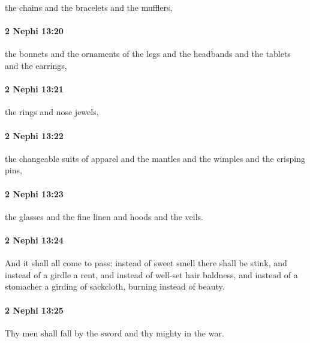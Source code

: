 			the chains and the bracelets and the mufflers,

		\paragraph{2 Nephi 13:20} %
			\label{2NEPHI-13-20}

			the bonnets and the ornaments of the legs
			and the headbands and the tablets and the earrings,

		\paragraph{2 Nephi 13:21} %
			\label{2NEPHI-13-21}

			the rings and nose jewels,

		\paragraph{2 Nephi 13:22} %
			\label{2NEPHI-13-22}

			the changeable suits of apparel
			and the mantles and the wimples and the crisping pins,

		\paragraph{2 Nephi 13:23} %
			\label{2NEPHI-13-23}

			the glasses and the fine linen and hoods and the veils.

		\paragraph{2 Nephi 13:24} %
			\label{2NEPHI-13-24}

			And it shall all come to pass:
			instead of sweet smell there shall be stink,
			and instead of a girdle a rent,
			and instead of well-set hair baldness,
			and instead of a stomacher a girding of sackcloth,
			burning instead of beauty.

		\paragraph{2 Nephi 13:25} %
			\label{2NEPHI-13-25}

			Thy men shall fall by the sword and thy mighty in the war.

